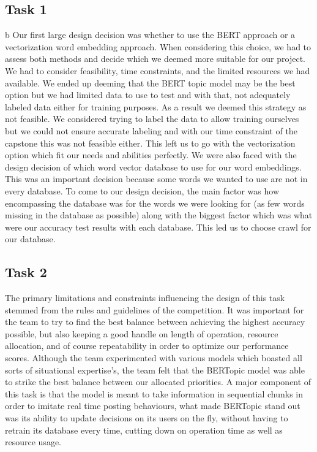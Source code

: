 \documentclass{article}
\begin{document}
\subsection{Task 1}b
Our first large design decision was whether to use the BERT approach or a vectorization word embedding approach. When considering this choice, we had to assess both methods and decide which we deemed more suitable for our project. We had to consider feasibility, time constraints, and the limited resources we had available. We ended up deeming that the BERT topic model may be the best option but we had limited data to use to test and with that, not adequately labeled data either for training purposes. As a result we deemed this strategy as not feasible. We considered trying to label the data to allow training ourselves but we could not ensure accurate labeling and with our time constraint of the capstone this was not feasible either. This left us to go with the vectorization option which fit our needs and abilities perfectly. We were also faced with the design decision of which word vector database to use for our word embeddings. This was an important decision because some words we wanted to use are not in every database. To come to our design decision, the main factor was how encompassing the database was for the words we were looking for (as few words missing in the database as possible) along with the biggest factor which was what were our accuracy test results with each database. This led us to choose crawl for our database. 

\subsection{Task 2}
The primary limitations and constraints influencing the design of this task stemmed from the rules and guidelines of the competition. It was important for the team to try to find the best balance between achieving the highest accuracy possible, but also keeping a good handle on length of operation, resource allocation, and of course repeatability in order to optimize our performance scores. Although the team experimented with various models which boasted all sorts of situational expertise's, the team felt that the BERTopic model was able to strike the best balance between our allocated priorities. A major component of this task is that the model is meant to take information in sequential chunks in order to imitate real time posting behaviours, what made BERTopic stand out was its ability to update decisions on its users on the fly, without having to retrain its database every time, cutting down on operation time as well as resource usage.
\end{document}
